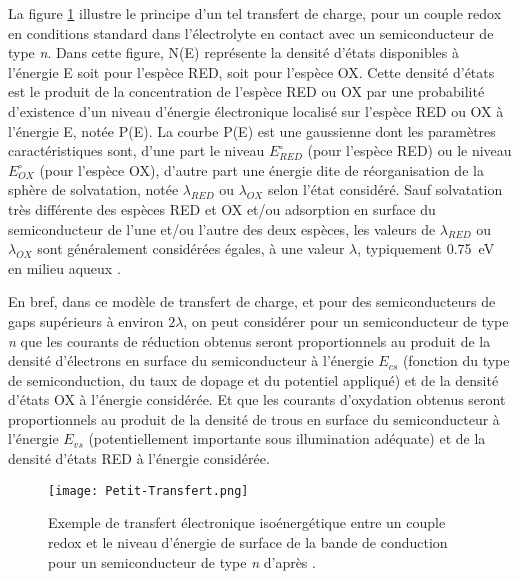 \begin{refsection}
    La figure \ref{fig:ch4_isoE_transfert} illustre le principe d’un tel transfert de charge, pour un couple redox en conditions standard dans
    l’électrolyte en contact avec un semiconducteur de type \emph{n}. Dans cette figure, N(E) représente la densité d’états
    disponibles à l’énergie E soit pour l’espèce RED, soit pour l’espèce OX. Cette densité d’états est le produit de la
    concentration de l’espèce RED ou OX par une probabilité d’existence d’un niveau d’énergie électronique localisé sur
    l’espèce RED ou OX à l’énergie E, notée P(E). La courbe P(E) est une gaussienne dont les paramètres caractéristiques
    sont, d’une part le niveau $E^{\circ}_{RED}$ (pour l’espèce RED) ou le niveau $E^{\circ}_{OX}$ (pour l’espèce OX), d’autre part une énergie dite
    de réorganisation de la sphère de solvatation, notée $\lambda _{RED}$ ou $\lambda _{OX}$ selon l’état considéré. Sauf solvatation très
    différente des espèces RED et OX et/ou adsorption en surface du semiconducteur de l’une et/ou l’autre des deux espèces,
    les valeurs de $\lambda _{RED}$ ou $\lambda _{OX}$ sont généralement considérées égales, à une valeur $\lambda$, typiquement 0.75~eV 
    en milieu aqueux \citep{Gomes1973}.

    En bref, dans ce modèle de transfert de charge, et pour des semiconducteurs de gaps supérieurs à environ $2\lambda$, on peut
    considérer pour un semiconducteur de type \emph{n} que les courants de réduction obtenus seront proportionnels au produit de la
    densité d’électrons en surface du semiconducteur à l’énergie $E_{cs}$ (fonction du type de semiconduction, du taux de dopage
    et du potentiel appliqué) et de la densité d’états OX à l’énergie considérée. Et que les courants d’oxydation obtenus
    seront proportionnels au produit de la densité de trous en surface du semiconducteur à l’énergie $E_{vs}$
    (potentiellement importante sous illumination adéquate) et de la densité d’états RED à l’énergie considérée.

    \begin{figure}[H]
        \centering
        \texttt{[image: Petit-Transfert.png]}
        \caption[Exemple de transfert électronique isoénergétique entre un couple redox et le niveau d’énergie de
        surface de la bande de conduction pour un semiconducteur de type \emph{n}.]
        {Exemple de transfert électronique isoénergétique entre un couple redox et le niveau d’énergie de
        surface de la bande de conduction pour un semiconducteur de type \emph{n} d’après \citep{Petit2010}.}
        \label{fig:ch4_isoE_transfert}
    \end{figure}


\end{refsection}

